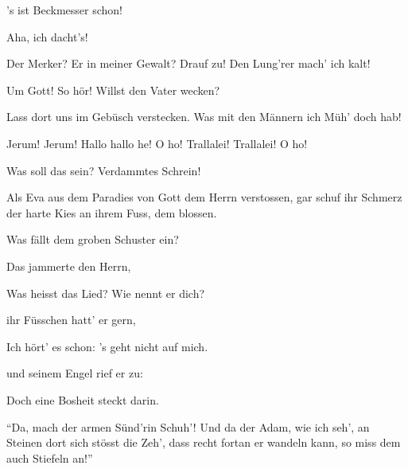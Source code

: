 \begin{drama}
's ist Beckmesser schon!

\Sachsspeaks
Aha, ich dacht's!



\Waltherspeaks
Der Merker? Er in meiner Gewalt?
Drauf zu! Den Lung'rer mach' ich kalt!

\Evaspeaks
Um Gott! So hör! Willst den Vater wecken?


Lass dort uns im Gebüsch verstecken.
Was mit den Männern ich Müh' doch hab!



\Sachsspeaks

Jerum! Jerum! Hallo hallo he!
O ho! Trallalei! Trallalei! O ho!

\Beckmesserspeaks


Was soll das sein?
Verdammtes Schrein!

\Sachsspeaks
Als Eva aus dem Paradies
von Gott dem Herrn verstossen,
gar schuf ihr Schmerz der harte Kies
an ihrem Fuss, dem blossen.

\Beckmesserspeaks
Was fällt dem groben Schuster ein?

\Sachsspeaks
Das jammerte den Herrn,

\Waltherspeaks


Was heisst das Lied? Wie nennt er dich?

\Sachsspeaks
ihr Füsschen hatt' er gern,

\Evaspeaks


Ich hört' es schon:
's geht nicht auf mich.

\Sachsspeaks
und seinem Engel rief er zu:

\Evaspeaks
Doch eine Bosheit steckt darin.

\Sachsspeaks
``Da, mach der armen Sünd'rin Schuh'!
Und da der Adam, wie ich seh',
an Steinen dort sich stösst die Zeh',
dass recht fortan er wandeln kann,
so miss dem auch Stiefeln an!''


\end{drama}
